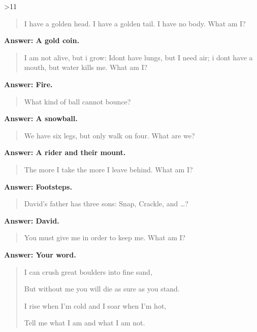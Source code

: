 \begin{multicols}{2}
\ifnum\month>11

\begin{quotation}
I have a golden head. I have a golden tail. I have no body.
What am I?
\end{quotation}

\textbf{Answer: A gold coin.}


\begin{quotation}
I am not alive, but i grow: Idont have lungs, but I need air; i dont have a mouth, but water kills me. What am I?
\end{quotation}

\textbf{Answer: Fire.}

\begin{quotation}
What kind of ball cannot bounce?
\end{quotation}

\textbf{Answer: A snowball.}

\fi

\begin{quotation}

	We have six legs, but only walk on four.
	What are we?

\end{quotation}

\textbf{Answer: A rider and their mount.}


\begin{quotation}
	The more I take the more I leave behind.
	What am I?
\end{quotation}

\textbf{Answer: Footsteps.}

\begin{quotation}
	David's father has three sons: Snap, Crackle, and  \ldots?
\end{quotation}

\textbf{Answer: David.}

\begin{quotation}
You must give me in order to keep me.
What am I? 
\end{quotation}

\textbf{Answer: Your word.}

\begin{quotation}

I can crush great boulders into fine sand,

But without me you will die as sure as you stand.

I rise when I'm cold and I soar when I'm hot,

Tell me what I am and what I am not.


\end{quotation}
\end{multicols}
